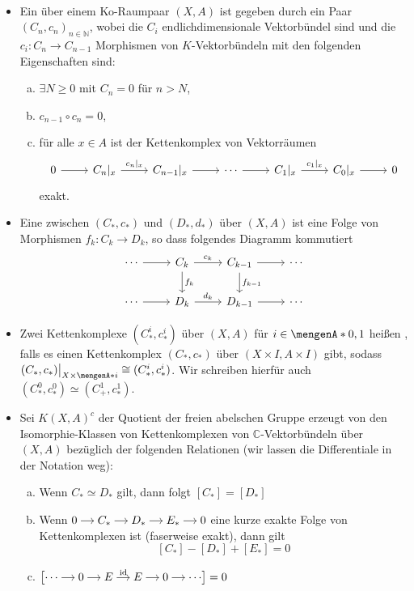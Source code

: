 \begin{definition}
\mbox{ }
\begin{itemize}
	\item Ein  über einem Ko-Raumpaar $(X,A)$ ist gegeben durch ein Paar $(C_n,c_n)_{n \in \mathds{N}}$, wobei die $C_i$ 
	endlichdimensionale Vektorbündel sind und die $c_i \colon C_n \to C_{n-1}$ Morphismen von $K$-Vektorbündeln mit den folgenden Eigenschaften sind:
	\begin{enumerate}[a)]
		\item $\exists N \ge 0$ mit $C_n=0$ für $n >N$,
		\item $c_{n-1} \circ c_n =0$,
		\item für alle $x \in A$ ist der Kettenkomplex von Vektorräumen
		\[
			\begin{tikzcd}
				0 \rar & C_n|_{x} \rar["c_n|_x"] & C_{n-1}|_x \rar & \cdots \rar & C_1|_x \rar["c_1|_x"] & C_0|_x \rar & 0
			\end{tikzcd}
		\]
		exakt.
	\end{enumerate}
	\item Eine  zwischen $(C_*,c_*)$ und $(D_*,d_*)$ über $(X,A)$ ist eine Folge von Morphismen $f_k \colon C_k \to D_k$, so dass folgendes Diagramm 
	kommutiert
	\[
		\begin{tikzcd}
			\cdots \rar & C_k \rar["c_k"] \dar["f_k"] & C_{k-1} \rar \dar["f_{k-1}"]& \cdots \\
			\cdots \rar & D_k \rar["d_k"] & D_{k-1} \rar & \cdots
		\end{tikzcd}
	\]
	\item Zwei Kettenkomplexe $(C_*^i, c_*^i)$ über $(X,A)$ für $i \in \set{0,1}$ heißen , falls es einen Kettenkomplex $(C_*,c_*)$ über 
	$(X\times I, A \times I)$ gibt, sodass $(C_*,c_*)\big|_{X \times \set{i} } \cong (C_*^i,c_*^i)$. Wir schreiben hierfür auch $(C_*^0,c_*^0) \simeq (C_+^1, c_*^1)$.
	\item Sei $K(X,A)^c$ der Quotient der freien abelschen Gruppe erzeugt von den Isomorphie-Klassen von Kettenkomplexen von $\mathds{C}$-Vektorbündeln über $(X,A)$ 
	bezüglich der folgenden Relationen (wir lassen die Differentiale in der Notation weg):
	\begin{enumerate}[a)]
		\item Wenn $C_* \simeq D_*$ gilt, dann folgt $[C_*] = [D_*]$
		\item Wenn $\begin{tikzcd}[cramped,sep=small]
			0 \rar & C_* \rar & D_* \rar & E_* \rar & 0
		\end{tikzcd}$ eine kurze exakte Folge von Kettenkomplexen ist (faserweise exakt), dann gilt
		\[
			[C_*] - [D_*] + [E_*] = 0
		\]
		\item \(
			\big[ \begin{tikzcd}[cramped,sep=small]
				\cdots \rar & 0 \rar & E \rar["\id"] & E \rar & 0 \rar & \cdots
			\end{tikzcd}\big] =0
		\) 
	\end{enumerate}
\end{itemize}
\end{definition}
